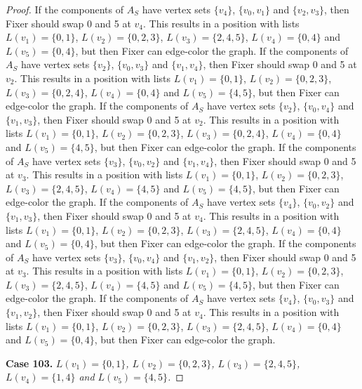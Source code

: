 \documentclass[12pt]{amsart}
\theoremstyle{plain}
\theoremstyle{definition}
\theoremstyle{remark}
\begin{document}
\begin{proof}
If the components of $A_S$ have vertex sets $\{v_4\}$, $\{v_0, v_1\}$ and $\{v_2, v_3\}$, then Fixer should swap 0 and 5 at $v_4$. This results in a position with lists $L(v_1) = \{0, 1\}$, $L(v_2) = \{0, 2, 3\}$, $L(v_3) = \{2, 4, 5\}$, $L(v_4) = \{0, 4\}$ and $L(v_5) = \{0, 4\}$, but then Fixer can edge-color the graph.
If the components of $A_S$ have vertex sets $\{v_2\}$, $\{v_0, v_3\}$ and $\{v_1, v_4\}$, then Fixer should swap 0 and 5 at $v_2$. This results in a position with lists $L(v_1) = \{0, 1\}$, $L(v_2) = \{0, 2, 3\}$, $L(v_3) = \{0, 2, 4\}$, $L(v_4) = \{0, 4\}$ and $L(v_5) = \{4, 5\}$, but then Fixer can edge-color the graph.
If the components of $A_S$ have vertex sets $\{v_2\}$, $\{v_0, v_4\}$ and $\{v_1, v_3\}$, then Fixer should swap 0 and 5 at $v_2$. This results in a position with lists $L(v_1) = \{0, 1\}$, $L(v_2) = \{0, 2, 3\}$, $L(v_3) = \{0, 2, 4\}$, $L(v_4) = \{0, 4\}$ and $L(v_5) = \{4, 5\}$, but then Fixer can edge-color the graph.
If the components of $A_S$ have vertex sets $\{v_3\}$, $\{v_0, v_2\}$ and $\{v_1, v_4\}$, then Fixer should swap 0 and 5 at $v_3$. This results in a position with lists $L(v_1) = \{0, 1\}$, $L(v_2) = \{0, 2, 3\}$, $L(v_3) = \{2, 4, 5\}$, $L(v_4) = \{4, 5\}$ and $L(v_5) = \{4, 5\}$, but then Fixer can edge-color the graph.
If the components of $A_S$ have vertex sets $\{v_4\}$, $\{v_0, v_2\}$ and $\{v_1, v_3\}$, then Fixer should swap 0 and 5 at $v_4$. This results in a position with lists $L(v_1) = \{0, 1\}$, $L(v_2) = \{0, 2, 3\}$, $L(v_3) = \{2, 4, 5\}$, $L(v_4) = \{0, 4\}$ and $L(v_5) = \{0, 4\}$, but then Fixer can edge-color the graph.
If the components of $A_S$ have vertex sets $\{v_3\}$, $\{v_0, v_4\}$ and $\{v_1, v_2\}$, then Fixer should swap 0 and 5 at $v_3$. This results in a position with lists $L(v_1) = \{0, 1\}$, $L(v_2) = \{0, 2, 3\}$, $L(v_3) = \{2, 4, 5\}$, $L(v_4) = \{4, 5\}$ and $L(v_5) = \{4, 5\}$, but then Fixer can edge-color the graph.
If the components of $A_S$ have vertex sets $\{v_4\}$, $\{v_0, v_3\}$ and $\{v_1, v_2\}$, then Fixer should swap 0 and 5 at $v_4$. This results in a position with lists $L(v_1) = \{0, 1\}$, $L(v_2) = \{0, 2, 3\}$, $L(v_3) = \{2, 4, 5\}$, $L(v_4) = \{0, 4\}$ and $L(v_5) = \{0, 4\}$, but then Fixer can edge-color the graph.

\noindent\textbf{Case 103.  }\textit{$L(v_1) = \{0, 1\}$, $L(v_2) = \{0, 2, 3\}$, $L(v_3) = \{2, 4, 5\}$, $L(v_4) = \{1, 4\}$ and $L(v_5) = \{4, 5\}$.}


\end{proof}
\end{document}
